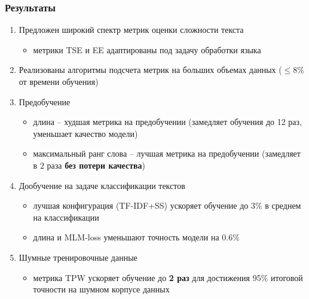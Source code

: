 \documentclass{beamer}
\begin{document}
\begin{frame}
	\frametitle{Результаты}
	\begin{enumerate}
		\item Предложен широкий спектр метрик оценки сложности текста
		\begin{itemize}
			\item метрики TSE и EE адаптированы под задачу обработки языка
		\end{itemize}
		\item Реализованы алгоритмы подсчета метрик на больших объемах данных ($\le 8\%$ от времени обучения)
		\item Предобучение
			\begin{itemize}
				\item длина -- худшая метрика на предобучении (замедляет обучения до 12 раз, уменьшает качество модели)
				\item максимальный ранг слова -- лучшая метрика на предобучении (замедляет в $2$ раза {\bf без потери качества})
			\end{itemize}
		\item Дообучение на задаче классификации текстов
			\begin{itemize}
				\item лучшая конфигурация (TF-IDF+SS) ускоряет обучение до 3\% в среднем на классификации
				\item длина и MLM-loss уменьшают точность модели на 0.6\%
			\end{itemize}
		\item Шумные тренировочные данные
			\begin{itemize}
				\item 
				метрика TPW ускоряет обучение до {\bf 2 раз} для достижения 95\% итоговой точности на шумном корпусе данных
			\end{itemize}
	\end{enumerate}
\end{frame}

\appendix
\end{document}
